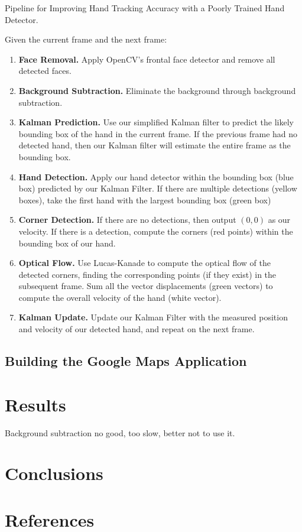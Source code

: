 \documentclass[12pt]{article}
\begin{document}
\begin{algorithm}
\caption{Pipeline for Improving Hand Tracking Accuracy with a Poorly Trained Hand Detector.}
\label{pipeline}

\noindent Given the current frame and the next frame:
\begin{enumerate}
\item {\bf Face Removal.} Apply OpenCV's frontal face detector and remove all detected faces.
\item {\bf Background Subtraction.} Eliminate the background through background subtraction.
\item {\bf Kalman Prediction.} Use our simplified Kalman filter to predict the likely bounding box of the hand in the current frame. If the previous frame had no detected hand, then our Kalman filter will estimate the entire frame as the bounding box.
\item {\bf Hand Detection.} Apply our hand detector within the bounding box (blue box) predicted by our Kalman Filter. If there are multiple detections (yellow boxes), take the first hand with the largest bounding box (green box)
\item {\bf Corner Detection.} If there are no detections, then output $(0,0)$ as our velocity. If there is a detection, compute the corners (red points) within the bounding box of our hand.
\item {\bf Optical Flow.} Use Lucas-Kanade to compute the optical flow of the detected corners, finding the corresponding points (if they exist) in the subsequent frame. Sum all the vector displacements (green vectors) to compute the overall velocity of the hand (white vector).
\item {\bf Kalman Update.} Update our Kalman Filter with the measured position and velocity of our detected hand, and repeat on the next frame.
\end{enumerate}
\end{algorithm}

\subsection{Building the Google Maps Application}

\section{Results}

Background subtraction no good, too slow, better not to use it. 

\section{Conclusions}

\section{References}
\end{document}

